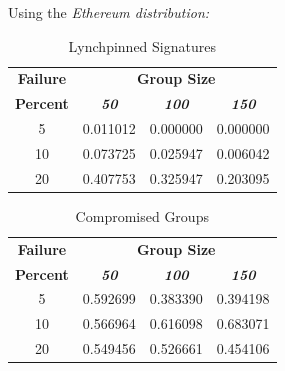 \documentclass[conference]{IEEEtran}
\begin{document}
        Using the \textit{Ethereum distribution:} 
        \begin{table}[h!]
            \caption{Lynchpinned Signatures}
            \begin{center}
            \begin{tabular}{|c|c|c|c|}
            \hline
            \textbf{Failure}&\multicolumn{3}{|c|}{\textbf{Group Size}} \\
            \cline{2-4} 
            \textbf{Percent} & \textbf{\textit{50}}& \textbf{\textit{100}}& \textbf{\textit{150}} \\
            \hline
            5 &  0.011012 &  0.000000 &  0.000000 \\
            \hline
            10 &  0.073725 &  0.025947 &  0.006042 \\
            \hline
            20 &  0.407753 &  0.325947 &  0.203095 \\
            \hline
            \end{tabular}
            \label{lynchpinned_table2}
            \end{center}
        \end{table}

        \begin{table}[h!]
            \caption{Compromised Groups}
            \begin{center}
            \begin{tabular}{|c|c|c|c|}
            \hline
            \textbf{Failure}&\multicolumn{3}{|c|}{\textbf{Group Size}} \\
            \cline{2-4} 
            \textbf{Percent} & \textbf{\textit{50}}& \textbf{\textit{100}}& \textbf{\textit{150}} \\
            \hline
            5 &  0.592699 &  0.383390 &  0.394198 \\
            \hline
            10 &  0.566964 &  0.616098 &  0.683071 \\
            \hline
            20 &  0.549456 &  0.526661 &  0.454106 \\
            \hline
            \end{tabular}
            \label{compromised_table2}
            \end{center}
        \end{table}
\end{document}
